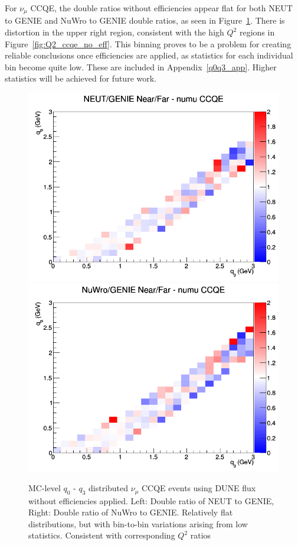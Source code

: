 \documentclass[12pt]{article}
\begin{document}
For $\nu_{\mu}$ CCQE, the double ratios without efficiencies appear flat for both NEUT to GENIE and NuWro to GENIE double ratios, as seen in Figure~\ref{fig:q0q3_numu_CCQE_no_eff}. There is distortion in the upper right region, consistent with the high $Q^2$ regions in Figure~\ref{fig:Q2_ccqe_no_eff}.  This binning proves to be a problem for creating reliable conclusions once efficiencies are applied, as statistics for each individual bin become quite low. These are included in Appendix~\ref{q0q3_app}. Higher statistics will be achieved for future work.
\begin{figure}[h]
\centering
{}
\includegraphics[width=\linewidth]{q0_q3/nominal/ratios/CCQE_NEUT_GENIE_numu_NF_q3_q0.png}
\endminipage
{}
\includegraphics[width=\linewidth]{q0_q3/nominal/ratios/CCQE_NuWro_GENIE_numu_NF_q3_q0.png}
\endminipage
\caption{MC-level $q_0 \textrm{ - } q_3$ distributed $\nu_{\mu}$ CCQE events using DUNE flux without efficiencies applied. Left: Double ratio of NEUT to GENIE, Right: Double ratio of NuWro to GENIE. Relatively flat distributions, but with bin-to-bin variations arising from low statistics. Consistent with corresponding $Q^2$ ratios} 
\label{fig:q0q3_numu_CCQE_no_eff}
\end{figure}
\FloatBarrier
\end{document}

